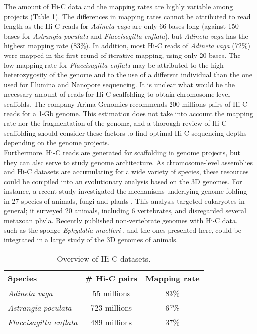 The amount of Hi-C data and the mapping rates are highly variable among projects (Table \ref{tab:hic_data}). The differences in mapping rates cannot be attributed to read length as the Hi-C reads for \textit{Adineta vaga} are only 66 bases-long (against 150 bases for \textit{Astrangia poculata} and \textit{Flaccisagitta enflata}), but \textit{Adineta vaga} has the highest mapping rate (83\%). In addition, most Hi-C reads of \textit{Adineta vaga} (72\%) were mapped in the first round of iterative mapping, using only 20 bases. The low mapping rate for \textit{Flaccisagitta enflata} may be attributed to the high heterozygosity of the genome and to the use of a different individual than the one used for Illumina and Nanopore sequencing. It is unclear what would be the necessary amount of reads for Hi-C scaffolding to obtain chromosome-level scaffolds. The company Arima Genomics recommends 200 millions pairs of Hi-C reads for a 1-Gb genome. This estimation does not take into account the mapping rate nor the fragmentation of the genome, and a thorough review of Hi-C scaffolding should consider these factors to find optimal Hi-C sequencing depths depending on the genome projects. \\

Furthermore, Hi-C reads are generated for scaffolding in genome projects, but they can also serve to study genome architecture. As chromosome-level assemblies and Hi-C datasets are accumulating for a wide variety of species, these resources could be compiled into an evolutionary analysis based on the 3D genomes. For instance, a recent study investigated the mechanisms underlying genome folding in 27 species of animals, fungi and plants \cite{hic_genomes}. This analysis targeted eukaryotes in general; it surveyed 20 animals, including 6 vertebrates, and disregarded several metazoan phyla. Recently published non-vertebrate genomes with Hi-C data, such as the sponge \textit{Ephydatia muelleri} \cite{ephydatia_mulleri}, and the ones presented here, could be integrated in a large study of the 3D genomes of animals. \\

\begin{table}
\centering
\begin{tabular}{lcc}
\hline
\textbf{Species} & \textbf{\# Hi-C pairs} & \textbf{Mapping rate} \\
\hline
\textit{Adineta vaga} & 55 millions & 83\% \\
\textit{Astrangia poculata} & 723 millions & 67\% \\
\textit{Flaccisagitta enflata} & 489 millions & 37\% \\
\hline
\end{tabular}
\caption{Overview of Hi-C datasets.}
\label{tab:hic_data}
\end{table}

